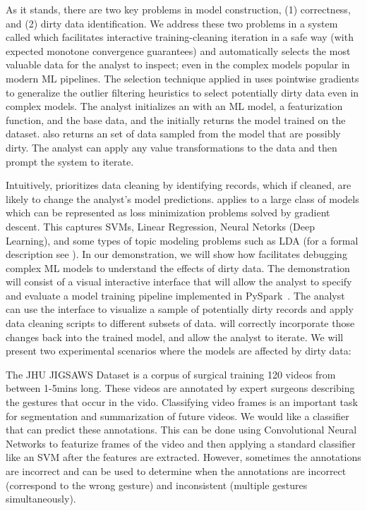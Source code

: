 As it stands, there are two key problems in model construction, (1) correctness, and (2) dirty data identification.
We address these two problems in a system called \sys which facilitates interactive training-cleaning iteration in a safe way (with expected monotone convergence guarantees) and automatically selects the most valuable data for the analyst to inspect; even in the complex models popular in modern ML pipelines.
The selection technique applied in \sys uses pointwise gradients to generalize the outlier filtering heuristics to select potentially dirty data even in complex models. 
The analyst initializes an \sys with an ML model, a featurization function, and the base data, and the \sys initially returns the model trained on the dataset.
\sys also returns an set of data sampled from the model that are possibly dirty.
The analyst can apply any value transformations to the data and then prompt the system to iterate. 

Intuitively, \sys prioritizes data cleaning by identifying records, which if cleaned, are likely to change the analyst's model predictions.
\sys applies to a large class of models which can be represented as loss minimization problems solved by gradient descent.
This captures SVMs, Linear Regression, Neural Netorks (Deep Learning), and some types of topic modeling problems such as LDA (for a formal description see \cite{activecleanarxiv}).
In our demonstration, we will show how \sys facilitates debugging complex ML models to understand the effects of dirty data.
The demonstration will consist of a visual interactive interface that will allow the analyst to specify and evaluate a model training pipeline implemented in PySpark~\cite{pyspark}.
The analyst can use the interface to visualize a sample of potentially dirty records and apply data cleaning scripts to different subsets of data.
\sys will correctly incorporate those changes back into the trained model, and allow the analyst to iterate.  
We will present two experimental scenarios where the models are affected by dirty data: 

\begin{example}\sloppy
The JHU JIGSAWS Dataset is a corpus of surgical training 120 videos from between 1-5mins long.
These videos are annotated by expert surgeons describing the gestures that occur in the vido. 
Classifying video frames is an important task for segmentation and summarization of future videos.
We would like a classifier that can predict these annotations.
This can be done using Convolutional Neural Networks to featurize frames of the video and then applying a standard classifier like an SVM after the features are extracted.
However, sometimes the annotations are incorrect and \sys can be used to determine when the annotations are incorrect (correspond to the wrong gesture) and inconsistent (multiple gestures simultaneously).
\end{example}

